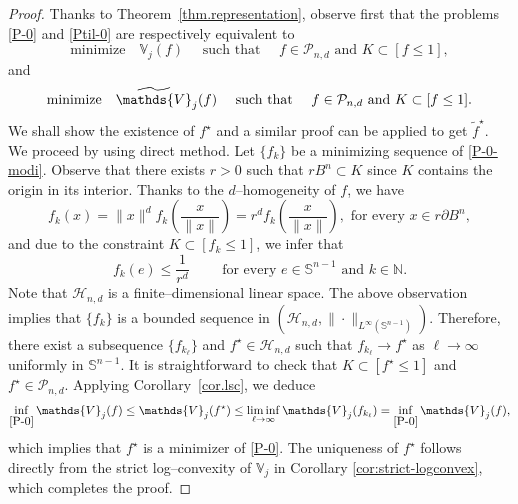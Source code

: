 \documentclass[11pt]{article}
\theoremstyle{definition}
\numberwithin{equation}{section}
\newcommand{\cH}{\mathcal{H}}        %
\newcommand{\cP}{\mathcal{P}}        %
\newcommand{\opV}{\mathds{V}}       %
\begin{document}
\begin{proof}
    Thanks to Theorem~\ref{thm.representation}, observe first that the problems \eqref{P-0} and \eqref{Ptil-0} are respectively equivalent to
    \begin{equation}\label{P-0-modi}
        \text{minimize} \quad \opV_j(f) \quad \text{ such that } \quad f \in \cP_{n, d} \text{ and }K \subset [f \leq 1],
    \end{equation}
    and
    \begin{equation}
        \text{minimize} \quad 
        \widetilde\opV_j(f) \quad \text{ such that } \quad f \in \cP_{n, d} \text{ and }K \subset [f \leq 1].
    \end{equation}
    We shall show the existence of $f^\star$ and a similar proof can be applied to get $\widetilde f^\star$. 
    We proceed by using direct method.
    Let $\{ f_k \}$ be a minimizing sequence of \eqref{P-0-modi}.
    Observe that there exists $r > 0$ such that $rB^n \subset K$ since $K$ contains the origin in its interior.
    Thanks to the $d$--homogeneity of $f$, we have
        \[
            f_k(x) = \| x \|^d f_k\left( \dfrac{x}{\| x \|} \right) = r^d f_k \left( \dfrac{x}{\| x \|} \right), \text{ for every } x \in r \partial B^n,
        \]
    and due to the constraint $K \subset [f_k \leq 1]$, we infer that
        \[
            f_k(e) \leq \frac{1}{r^d} \qquad \text{ for every } e \in \mathbb S^{n - 1} \text{ and } k \in \mathbb N.
        \]
    Note that $\cH_{n, d}$ is a finite--dimensional linear space. 
    The above observation implies that $\{ f_k \} $ is a bounded sequence in $( \cH_{n, d}, \| \cdot \|_{L^\infty(\mathbb S^{n - 1})})$.
    Therefore, there exist a subsequence $\{ f_{k_\ell} \}$ and $f^\star \in \cH_{n, d}$ such that $f_{k_\ell} \to f^\star$ as $\ell \to \infty$ uniformly in $\mathbb S^{n - 1}$.
    It is straightforward to check that $K \subset [f^\star \leq 1]$ and $f^\star \in \cP_{n, d}$.
    Applying Corollary~\ref{cor.lsc}, we deduce
        \begin{align*}
            \inf_{\eqref{P-0}} \opV_j(f) \leq \opV_j(f^\star) \leq \liminf_{\ell \to \infty} \opV_j(f_{k_\ell}) = \inf_{\eqref{P-0}} \opV_j(f),
        \end{align*}
    which implies that $f^\star$ is a minimizer of \eqref{P-0}.
    The uniqueness of $f^\star$ follows directly from the strict log--convexity of $\opV_j$ in Corollary \ref{cor:strict-logconvex}, which completes the proof.
\end{proof}
\end{document}

